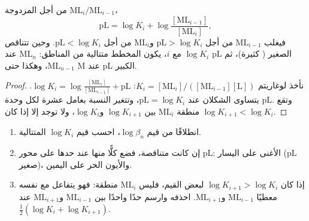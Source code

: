 \begin{proposition}\label{prop:b1:complexation:pl-boundaries}
من أجل المزدوجة $\mathrm{ML}_i/\mathrm{ML}_{i-1}$،
\[
  \mathrm{pL} = \log K_i + \log\frac{[\mathrm{ML}_{i-1}]}{[\mathrm{ML}_i]} ,
\]
فيغلب $\mathrm{ML}_{i-1}$ من أجل $\mathrm{pL} > \log K_i$
و$\mathrm{ML}_i$ من أجل $\mathrm{pL} < \log K_i$. وحين تتناقص $\log K_i$
مع $i$، يكون المخطط متتالية من المناطق: $\mathrm{ML}_n$ عند pL
الصغير ( كثيرة)، ثم $\mathrm{ML}_{n-1}$، وهكذا حتى M عند pL الكبير.
\end{proposition}

\begin{proof}
نأخذ لوغاريتم $K_i = [\mathrm{ML}_i]/([\mathrm{ML}_{i-1}][\mathrm{L}])$:
$\log K_i = \log\frac{[\mathrm{ML}_i]}{[\mathrm{ML}_{i-1}]} + \mathrm{pL}$.
يتساوى الشكلان عند $\mathrm{pL} = \log K_i$، وتتغير النسبة
بعامل عشرة لكل وحدة pL. وتقع منطقة $\mathrm{ML}_i$ بين
$\log K_{i+1}$ و$\log K_i$، ولا توجد إلا إذا كان $\log K_{i+1} < \log
K_i$.
\end{proof}

\begin{method}\label{met:b1:complexation:pl-diagram}
\begin{enumerate}
  \item انطلاقًا من قيم $\log\beta_n$، احسب قيم $\log K_i$ المتتالية.
  \item إن كانت متناقصة، فضع كلًّا منها عند حدها على محور pL:
         الأغنى  على اليسار (pL صغير)، والأيون
        الحر على اليمين.
  \item إذا كان $\log K_{i+1} > \log K_i$ لبعض القيم، فليس  $\mathrm{ML}_i$
        منطقة: فهو يتفاعل مع نفسه معطيًا $\mathrm{ML}_{i-1}$
        و$\mathrm{ML}_{i+1}$. احذفه وارسم حدًا واحدًا بين
        $\mathrm{ML}_{i-1}$ و$\mathrm{ML}_{i+1}$ عند
        $\frac12(\log K_i + \log K_{i+1})$.
\end{enumerate}
\end{method}

